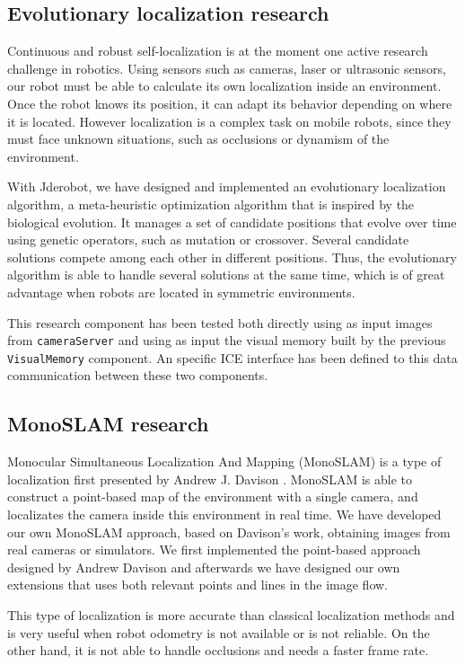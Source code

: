 \documentclass[twocolumn]{svjour3}          %
\begin{document}
\subsection{Evolutionary localization research}

Continuous and robust self-localization is at the moment one active research challenge in robotics. Using sensors such as cameras, laser or ultrasonic sensors, our robot must be able to calculate its own localization inside an environment. Once the robot knows its position, it can adapt its behavior depending on where it is located. However localization is a complex task on mobile robots, since they must face unknown situations, such as occlusions or dynamism of the environment. 

With Jderobot, we have designed and implemented an evolutionary localization algorithm, a meta-heuristic optimization algorithm that is inspired by the biological evolution. It manages a set of candidate positions that evolve over time using genetic operators, such as mutation or crossover. Several candidate solutions compete among each other in different positions. Thus, the evolutionary algorithm is able to handle several solutions at the same time, which is of great advantage when robots are located in symmetric environments.  

This research component has been tested both directly using as input images from \texttt{cameraServer} and using as input the visual memory built by the previous \texttt{VisualMemory} component. An specific ICE interface has been defined to this data communication between these two components.

\subsection{MonoSLAM research}

Monocular Simultaneous Localization And Mapping (MonoSLAM) is a type of localization first presented by Andrew J. Davison \cite{ref}. MonoSLAM is able to construct a point-based map of the environment with a single camera, and localizates the camera inside this environment in real time. We have developed our own MonoSLAM approach, based on Davison's work, obtaining images from real cameras or simulators. We first implemented the point-based approach designed by Andrew Davison and afterwards we have designed our own extensions that uses both relevant points and lines in the image flow.

This type of localization is more accurate than classical localization methods and is very useful when robot odometry is not available or is not reliable. On the other hand, it is not able to handle occlusions and needs a faster frame rate.
\end{document}
